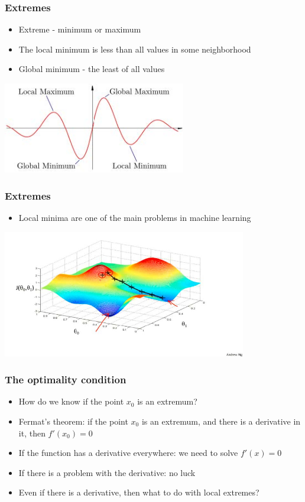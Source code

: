 \documentclass[default]{beamer}
\begin{document}
	\begin{frame}
		\frametitle{Extremes}
		
		\begin{itemize}
			\item Extreme - minimum or maximum
			\item The local minimum is less than all values in some neighborhood
			\item Global minimum - the least of all values
		\end{itemize}
	
		\centering
		\includegraphics[width=0.6\textwidth]{linear_11.jpg}
	\end{frame}


	\begin{frame}
		\frametitle{Extremes}
		
		\begin{itemize}
			\item Local minima are one of the main problems in machine learning
		\end{itemize}
		
		\centering
		\includegraphics[width=0.8\textwidth]{linear_12.jpg}
	\end{frame}


	\begin{frame}
		\frametitle{The optimality condition}
		
		\begin{itemize}
			\item How do we know if the point $x_0$ is an extremum?
			\item Fermat's theorem: if the point $x_0$ is an extremum, and there is a derivative in it, then $f'(x_0) = 0$
			\item If the function has a derivative everywhere: we need to solve $f'(x) = 0$
			\item If there is a problem with the derivative: no luck
			\item Even if there is a derivative, then what to do with local extremes?
		\end{itemize}
	\end{frame}
\end{document}
